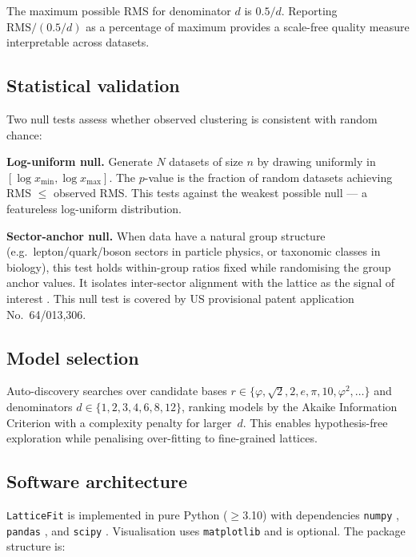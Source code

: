\documentclass[preprint,12pt]{elsarticle}
\begin{document}
The maximum possible RMS for denominator $d$ is $0.5/d$. Reporting
$\text{RMS} / (0.5/d)$ as a percentage of maximum provides a
scale-free quality measure interpretable across datasets.

\subsection{Statistical validation}

Two null tests assess whether observed clustering is consistent with
random chance:

\textbf{Log-uniform null.} Generate $N$ datasets of size $n$ by
drawing uniformly in $[\log x_{\min}, \log x_{\max}]$. The
$p$-value is the fraction of random datasets achieving
RMS $\leq$ observed RMS. This tests against the weakest
possible null --- a featureless log-uniform distribution.

\textbf{Sector-anchor null.} When data have a natural group
structure (e.g.\ lepton/quark/boson sectors in particle physics,
or taxonomic classes in biology), this test holds within-group
ratios fixed while randomising the group anchor values. It isolates
inter-sector alignment with the lattice as the signal of interest
\cite{Gentry2026masses}. This null test is covered by US
provisional patent application No.~64/013,306.

\subsection{Model selection}

Auto-discovery searches over candidate bases
$r \in \{\varphi, \sqrt{2}, 2, e, \pi, 10, \varphi^2, \ldots\}$
and denominators $d \in \{1, 2, 3, 4, 6, 8, 12\}$, ranking models
by the Akaike Information Criterion with a complexity penalty for
larger~$d$. This enables hypothesis-free exploration while
penalising over-fitting to fine-grained lattices.

\subsection{Software architecture}

\texttt{LatticeFit} is implemented in pure Python ($\geq$3.10) with
dependencies \texttt{numpy} \cite{numpy}, \texttt{pandas}
\cite{pandas}, and \texttt{scipy} \cite{scipy}. Visualisation
uses \texttt{matplotlib} \cite{matplotlib} and is optional.
The package structure is:
\end{document}
